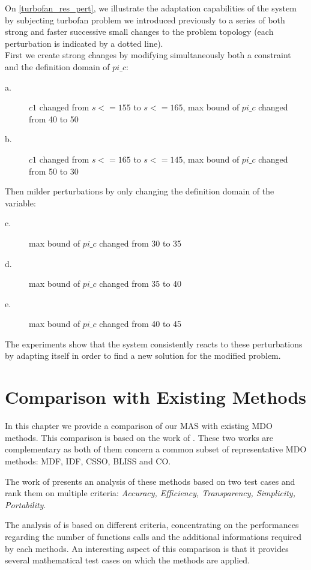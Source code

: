 On \figurename{} \ref{turbofan_res_pert}, we illustrate the adaptation capabilities of the system by subjecting turbofan problem we introduced previously to a series of both strong and faster successive small changes to the problem topology (each perturbation is indicated by a dotted line). \\
First we create strong changes by modifying simultaneously both a constraint and the definition domain of $pi\_c$:
\begin{description}
\item[a.] $c1$ changed from $s <= 155$ to $s <= 165$, max bound of $pi\_c$ changed from 40 to 50
\item[b.] $c1$ changed from $s <= 165$ to $s <= 145$, max bound of $pi\_c$ changed from 50 to 30
\end{description}
 Then milder perturbations by only changing the definition domain of the variable:
\begin{description}
\item[c.] max bound of $pi\_c$ changed from 30 to 35
\item[d.] max bound of $pi\_c$ changed from 35 to 40
\item[e.] max bound of $pi\_c$ changed from 40 to 45
\end{description}
The experiments show that the system consistently reacts to these perturbations by adapting itself in order to find a new solution for the modified problem.

\chapter{Comparison with Existing Methods}

In this chapter we provide a comparison of our MAS with existing MDO methods. This comparison is based on the work of \cite{perez2004evaluation, Yi2008}. These two works are complementary as both of them concern a common subset of representative MDO methods: MDF, IDF, CSSO, BLISS and CO.

The work of \cite{perez2004evaluation} presents an analysis of these methods based on two test cases and rank them on multiple criteria: \emph{Accuracy, Efficiency, Transparency, Simplicity, Portability}.

The analysis of \cite{Yi2008} is based on different criteria, concentrating on the performances regarding the number of functions calls and the additional informations required by each methods. An interesting aspect of this comparison is that it provides several mathematical test cases on which the methods are applied.

